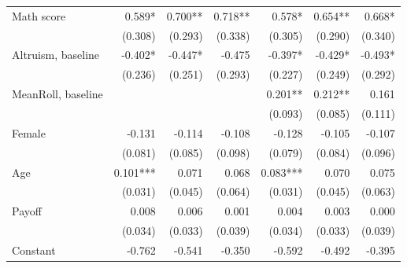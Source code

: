 \begin{table}[htbp]
\begin{adjustbox}{width=1\textwidth}
\begin{threeparttable}
\begin{tabular}{l*{6}{D{.}{.}{-1}}}
\midrule
Math score          &               0.589*  &               0.700** &               0.718** &               0.578*  &               0.654** &               0.668*  \\
                    &             (0.308)   &             (0.293)   &             (0.338)   &             (0.305)   &             (0.290)   &             (0.340)   \\
Altruism, baseline  &              -0.402*  &              -0.447*  &              -0.475   &              -0.397*  &              -0.429*  &              -0.493*  \\
                    &             (0.236)   &             (0.251)   &             (0.293)   &             (0.227)   &             (0.249)   &             (0.292)   \\
MeanRoll, baseline  &                       &                       &                       &               0.201** &               0.212** &               0.161   \\
                    &                       &                       &                       &             (0.093)   &             (0.085)   &             (0.111)   \\
Female              &              -0.131   &              -0.114   &              -0.108   &              -0.128   &              -0.105   &              -0.107   \\
                    &             (0.081)   &             (0.085)   &             (0.098)   &             (0.079)   &             (0.084)   &             (0.096)   \\
Age                 &               0.101***&               0.071   &               0.068   &               0.083***&               0.070   &               0.075   \\
                    &             (0.031)   &             (0.045)   &             (0.064)   &             (0.031)   &             (0.045)   &             (0.063)   \\
Payoff              &               0.008   &               0.006   &               0.001   &               0.004   &               0.003   &               0.000   \\
                    &             (0.034)   &             (0.033)   &             (0.039)   &             (0.034)   &             (0.033)   &             (0.039)   \\
Constant            &              -0.762   &              -0.541   &              -0.350   &              -0.592   &              -0.492   &              -0.395   \\

\end{tabular}
\end{threeparttable}
\end{adjustbox}
\end{table}

